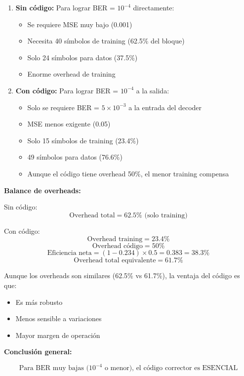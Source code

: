 \documentclass[11pt,a4paper]{article}
\begin{document}
\begin{enumerate}
    \item \textbf{Sin c\'odigo:} Para lograr BER = $10^{-4}$ directamente:
    \begin{itemize}
        \item Se requiere MSE muy bajo (0.001)
        \item Necesita 40 s\'imbolos de training (62.5\% del bloque)
        \item Solo 24 s\'imbolos para datos (37.5\%)
        \item Enorme overhead de training
    \end{itemize}
    
    \item \textbf{Con c\'odigo:} Para lograr BER = $10^{-4}$ a la salida:
    \begin{itemize}
        \item Solo se requiere BER = $5 \times 10^{-3}$ a la entrada del decoder
        \item MSE menos exigente (0.05)
        \item Solo 15 s\'imbolos de training (23.4\%)
        \item 49 s\'imbolos para datos (76.6\%)
        \item Aunque el c\'odigo tiene overhead 50\%, el menor training compensa
    \end{itemize}
\end{enumerate}

\textbf{Balance de overheads:}

Sin c\'odigo:
\[
\text{Overhead total} = 62.5\% \text{ (solo training)}
\]

Con c\'odigo:
\[
\text{Overhead training} = 23.4\%
\]
\[
\text{Overhead c\'odigo} = 50\%
\]
\[
\text{Eficiencia neta} = (1 - 0.234) \times 0.5 = 0.383 = 38.3\%
\]
\[
\text{Overhead total equivalente} = 61.7\%
\]

Aunque los overheads son similares (62.5\% vs 61.7\%), la ventaja del c\'odigo es que:
\begin{itemize}
    \item Es m\'as robusto
    \item Menos sensible a variaciones
    \item Mayor margen de operaci\'on
\end{itemize}

\textbf{Conclusi\'on general:}

\[
\boxed{\text{Para BER muy bajas ($10^{-4}$ o menor), el c\'odigo corrector es ESENCIAL}}
\]
\end{document}
